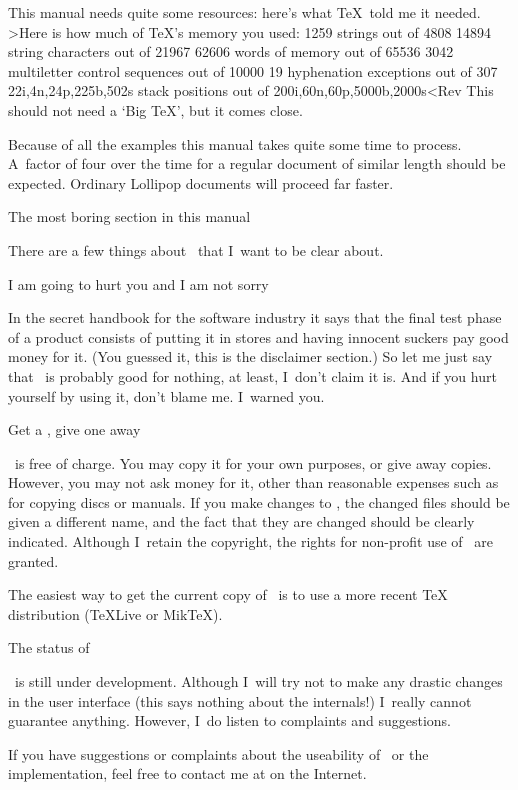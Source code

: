 This manual needs quite some resources: here's what \TeX\ told me
it needed.
\Ver>Here is how much of TeX's memory you used:
 1259 strings out of 4808
 14894 string characters out of 21967
 62606 words of memory out of 65536
 3042 multiletter control sequences out of 10000
 19 hyphenation exceptions out of 307
 22i,4n,24p,225b,502s stack positions out of 
 200i,60n,60p,5000b,2000s<Rev
This should not need a `Big \TeX', but it comes close.

Because of all the examples this manual takes quite some time to
process. A~factor of four over the time for a regular document of
similar length should be expected. Ordinary Lollipop documents will
proceed far faster.

\Section The most boring section in this manual

There are a few things about \Lollipop\ that I~want to be clear about.

\SubSection I am going to hurt you and I am not sorry

In the secret handbook for the software industry it says that the
final test phase of a product consists of putting it in stores and
having innocent suckers pay good money for it. (You guessed it, this
is the disclaimer section.) So let me just say that 
\Lollipop\ is probably good for nothing, at least, I~don't claim it
is. And if you hurt yourself by using it, don't blame me. I~warned
you.

\SubSection Get a \Lollipop, give one away

\Lollipop\ is free of charge. You may copy it
for your own purposes, or give away copies. However, you may not ask
money for it, other than reasonable expenses such as for copying discs
or manuals. If you make changes to \Lollipop, the changed files
should be given a different name, and the fact that they are changed
should be clearly indicated. Although I~retain the copyright, the
rights for non-profit use of \Lollipop\ are granted.

The easiest way to get the current copy of \Lollipop\ is to use
a more recent \TeX{} distribution (\TeX Live or Mik\TeX).

\SubSection The status of \Lollipop

\Lollipop\ is still under development. Although I~will try not to
make any drastic changes in the user interface (this says nothing
about the internals!) I~really cannot guarantee anything.
However, I~do listen to complaints and suggestions. 

If you have suggestions or complaints about the
useability of \Lollipop\ or the implementation, feel free to contact
me at  on the Internet. 

